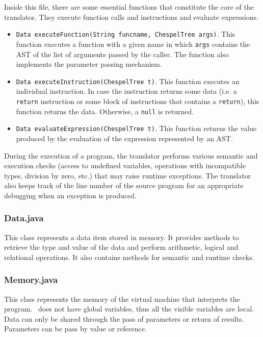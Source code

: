 Inside this file, there are some essential functions that constitute the
core of the translator. They execute function calls and instructions and
evaluate expressions.

\begin{itemize}
 \item \texttt{Data executeFunction(String funcname, ChespelTree args)}. This
function executes a function with a given name in which \texttt{args}
contains the AST of the list of arguments passed by the caller. The function
also implements the parameter passing mechanism.

\item \texttt{Data executeInstruction(ChespelTree t)}. This function executes
an individual instruction. In case the instruction returns some data (i.e. a
\texttt{return} instruction or some block of instructions that contains a
\texttt{return}), this function returns the data. Otherwise, a \texttt{null}
is returned.

\item \texttt{Data evaluateExpression(ChespelTree t)}. This function returns the
value produced by the evaluation of the expression represented by an AST.
\end{itemize}

During the execution of a program, the translator performs various semantic
and execution checks (access to undefined variables, operations with
incompatible types, division by zero, etc.) that may raise runtime exceptions.
The translator also keeps track of the line number of the source program for
an appropriate debugging when an exception is produced.

\subsubsection{Data.java}

This class represents a data item stored in memory. It provides methods to
retrieve the type and value of the data and perform arithmetic, logical and
relational operations. It also contains methods for semantic and runtime
checks.

\subsubsection{Memory.java}

This class represents the memory of the virtual machine that interprets
the program. \Chespel\ does not have global variables, thus all the visible
variables are local. Data can only be shared through the pass of parameters
or return of results. Parameters can be pass by value or reference.

